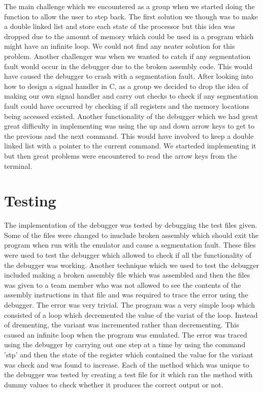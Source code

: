 \documentclass[12pt,a4paper,oneside]{report}
\begin{document}
The main challenge which we encountered as a group when we started doing the function to allow the user to step back. The first solution we though was to make a double linked list and store each state of the processor but this idea was dropped due to the amount of memory which could be used in a program which might have an infinite loop. We could not find any neater solution for this problem. Another challenger was when we wanted to catch if any segmentation fault would occur in the debugger due to the broken assembly code. This would have caused the debugger to crash with a  segmentation fault. After looking into how to design a signal handler in C, as a group we decided to drop the idea of making our own signal handler and carry out checks to check if any segmentation fault could have occurred by checking if all registers and the memory locations being accessed existed. Another functionality of the debugger which we had great great difficulty in implementing was using the up and down arrow keys to get to the previous and the next command. This would have involved to keep a double linked list with a pointer to the current command. We starteded implementing it but then great problems were encountered to read the arrow keys from the terminal.\\



\section*{Testing}


The implementation of the debugger was tested by debugging the test files given. Some of the files were changed to inuclude broken assembly which should exit the program when run with the emulator and cause a segmentation fault. These files were used to test the debugger which allowed to check if all the functionality of the debugger was working. Another technique which we used to test the debugger included making a broken assembly file which was assembled and then the files was given to a team member who was not allowed to see the contents of the assembly instructions in that file and was required to trace the error using the debugger. The error was very trivial. The program was a very simple loop which consisted of a loop which decremented the value of the variat of the loop. Instead of drementing, the variant was incremented rather than decrementing. This caused an infinite loop when the program was emulated. The error was traced using the debugger by carrying out one step at a time by using the command 'stp' and then the state of the register which contained the value for the variant was check and was found to increase. Each of the method which was unique to the debugger was tested by creating a test file for it which ran the method with dummy values to check whether it produces the correct output or not.\\
\end{document}
